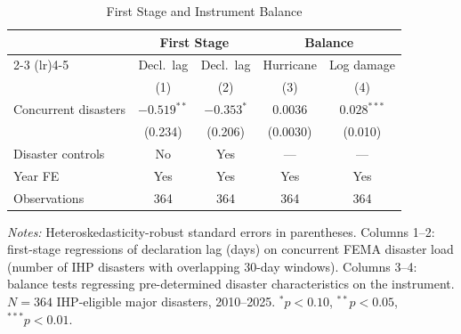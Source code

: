 \begin{table}[t]
\centering
\caption{First Stage and Instrument Balance}
\label{tab:firststage}
\begin{tabular}{lcccc}
\toprule
 & \multicolumn{2}{c}{First Stage} & \multicolumn{2}{c}{Balance} \\
\cmidrule(lr){2-3} \cmidrule(lr){4-5}
 & Decl.~lag & Decl.~lag & Hurricane & Log damage \\
 & (1) & (2) & (3) & (4) \\
\midrule
Concurrent disasters & $-0.519^{**}$ & $-0.353^{*}$ & $0.0036$ & $0.028^{***}$ \\
 & (0.234) & (0.206) & (0.0030) & (0.010) \\
\addlinespace
Disaster controls & No & Yes & --- & --- \\
Year FE & Yes & Yes & Yes & Yes \\
Observations & 364 & 364 & 364 & 364 \\
\bottomrule
\end{tabular}
\begin{tablenotes}[flushleft]
\small
\item \textit{Notes:} Heteroskedasticity-robust standard errors in parentheses.
Columns 1--2: first-stage regressions of declaration lag (days) on concurrent
FEMA disaster load (number of IHP disasters with overlapping 30-day windows).
Columns 3--4: balance tests regressing pre-determined disaster characteristics
on the instrument. $N = 364$ IHP-eligible major disasters, 2010--2025.
$^{*} p < 0.10$, $^{**} p < 0.05$, $^{***} p < 0.01$.
\end{tablenotes}
\end{table}
